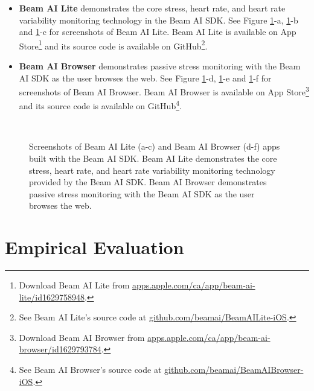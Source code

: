 \documentclass{article}
\begin{document}
\begin{itemize}
    \item \textbf{Beam AI Lite} demonstrates the core stress, heart rate, and heart rate variability monitoring technology in the Beam AI SDK. See Figure \ref{fig:screenshots}-a, \ref{fig:screenshots}-b and \ref{fig:screenshots}-c for screenshots of Beam AI Lite. Beam AI Lite is available on App Store\footnote{Download Beam AI Lite from \url{apps.apple.com/ca/app/beam-ai-lite/id1629758948}.} and its source code is available on GitHub\footnote{See Beam AI Lite's source code at \url{github.com/beamai/BeamAILite-iOS}.}.
    \item \textbf{Beam AI Browser} demonstrates passive stress monitoring with the Beam AI SDK as the user browses the web. See Figure \ref{fig:screenshots}-d, \ref{fig:screenshots}-e and \ref{fig:screenshots}-f for screenshots of Beam AI Browser. Beam AI Browser is available on App Store\footnote{Download Beam AI Browser from \url{apps.apple.com/ca/app/beam-ai-browser/id1629793784}.} and its source code is available on GitHub\footnote{See Beam AI Browser's source code at \url{github.com/beamai/BeamAIBrowser-iOS}.}.
\end{itemize}

\begin{figure}
    \centering
     \\
    \caption{Screenshots of Beam AI Lite (a-c) and Beam AI Browser (d-f) apps built with the Beam AI SDK. Beam AI Lite demonstrates the core stress, heart rate, and heart rate variability monitoring technology provided by the Beam AI SDK. Beam AI Browser demonstrates passive stress monitoring with the Beam AI SDK as the user browses the web.}
    \label{fig:screenshots}
\end{figure}

\section{Empirical Evaluation}
\label{sec:empirical-evaluation}
\end{document}
